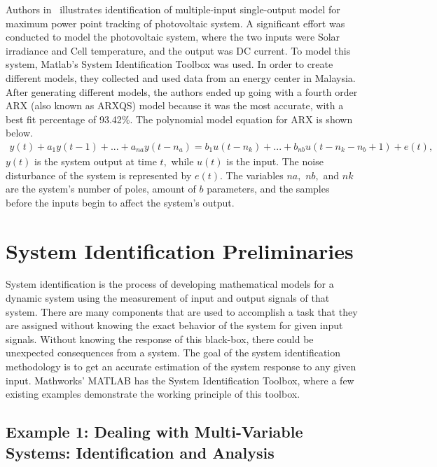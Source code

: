 \documentclass[letterpaper,12pt]{article}   %
\begin{document}
 Authors in~\cite{Hussain2011} illustrates identification of multiple-input
 single-output model for maximum power point tracking of photovoltaic system. A
 significant effort was conducted to model the photovoltaic system, where the two inputs were
 Solar irradiance and Cell temperature, and the output was DC current. To model
 this system, Matlab’s System Identification Toolbox was used. In order to
 create different models, they collected and used data from an energy center in
 Malaysia. After generating different models, the authors ended up going with a
 fourth order ARX (also known as ARXQS) model because it was the most accurate,
 with a best fit percentage of 93.42\%. The polynomial model equation for ARX is
 shown below. %
 \begin{align*}
   y(t) + a_1y(t - 1) +...+a_{na}y(t - n_{a}) = b_{1}u(t-n_{k})+...+b_{nb}u(t - n_{k}-n_{b}+1) + e(t), 
 \end{align*}
% 
$y(t)$ is the system output at time $t,$ while $u(t)$ is the input.  The noise disturbance of the system is represented by $e(t).$ The variables $na,$ $nb,$ and $nk$ are the system’s number of poles, amount of $b$ parameters, and the samples before the inputs begin to affect the system’s output.



\section{System Identification Preliminaries}

System identification is the process of developing mathematical models for a dynamic system using the measurement of input and output signals of that system. There are many components that are used to accomplish a task that they are assigned without knowing the exact behavior of the system for given input signals. Without knowing the response of this black-box, there could be unexpected consequences from a system. The goal of the system identification methodology is to get an accurate estimation of the system response to any given input. Mathworks' MATLAB has the System Identification Toolbox, where a few existing examples demonstrate the working principle of this toolbox.

\subsection{Example 1: Dealing with Multi-Variable Systems: Identification and Analysis}
\label{sec:sysID-Example1}
\end{document}
